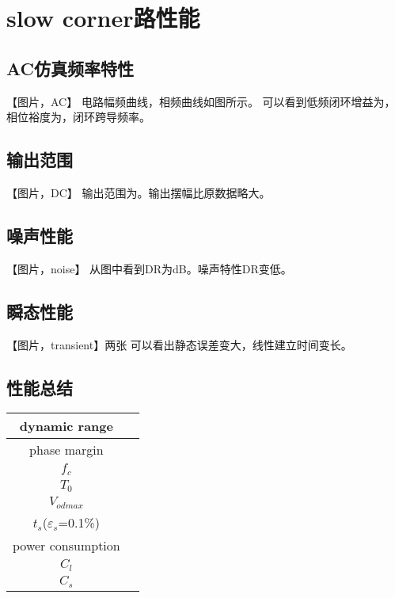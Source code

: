 \documentclass[a4paper]{article}
\begin{document}
\section{slow corner路性能}
\subsection{AC仿真频率特性}
【图片，AC】
电路幅频曲线，相频曲线如图所示。
可以看到低频闭环增益为，相位裕度为，闭环跨导频率。
\newpage
\subsection{输出范围}
【图片，DC】
输出范围为。输出摆幅比原数据略大。
\newpage
\subsection{噪声性能}
【图片，noise】
从图中看到DR为dB。噪声特性DR变低。
\newpage
\subsection{瞬态性能}
【图片，transient】两张
可以看出静态误差变大，线性建立时间变长。
\newpage
\subsection{性能总结}
\begin{table}[htbp]
    \begin{tabular}{|c|c|}
        \hline
        dynamic range&\\
        \hline
        phase margin&\\
        \hline
        $f_c$ &\\
        \hline 
        $T_0$&\\
        \hline
        $V_{odmax}$&\\
        \hline
        $t_s$($\varepsilon_s$=0.1\%)&\\
        \hline
        power consumption&\\
        \hline
        $C_l$&\\
        \hline
        $C_s$&\\
        \hline
    \end{tabular}
\end{table}

\newpage
\end{document}
